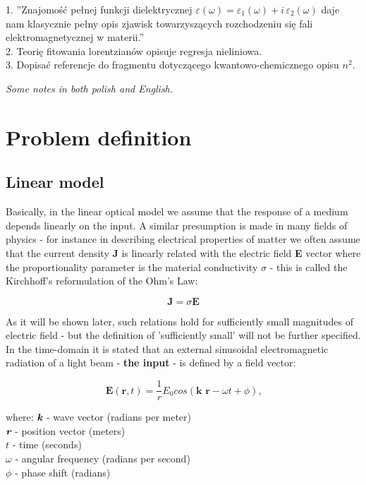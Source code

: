 \documentclass[12pt,twoside,a4paper]{article}
\numberwithin{equation}{subsection}
\numberwithin{figure}{subsection}
\begin{document}
1. ''Znajomość pełnej funkcji dielektrycznej $\varepsilon (\omega )={\varepsilon_{1}}(\omega ) + i\,{\varepsilon_{2}}(\omega )$
 daje nam klasycznie pełny opis zjawisk towarzyszących rozchodzeniu się fali elektromagnetycznej w materii.''\\
2. Teorię fitowania lorentzianów opisuje regresja nieliniowa.\\
3. Dopisać referencje do fragmentu dotyczącego kwantowo-chemicznego opisu $n^2$.

\textit{Some notes in both polish and English.}

\section{Problem definition} \label{chap:problem}

\subsection{Linear model} \label{chap:problem_lin}

Basically, in the linear optical model we assume that the response of a medium depends linearly on the input. A similar presumption
is made in many fields of physics - for instance in describing electrical properties of matter we often assume that the current density
\textbf{J} is linearly related with the electric field \textbf{E} vector where the proportionality parameter is the material
conductivity $\sigma $ - this is called the Kirchhoff's reformulation of the Ohm's Law:

\begin{equation} \label{eq:ohms_law}
  \textbf{J} = \sigma \textbf{E}
\end{equation}

As it will be shown later, such relations hold for sufficiently small magnitudes of electric field - but the definition of
'sufficiently small' will not be further specified. In the time-domain it is stated that an external sinusoidal electromagnetic 
radiation of a light beam - \textbf{the input} - is defined by a field vector:

\begin{equation} \label{eq:electromagnetic_radiation}
  \textbf{E} (\textbf{r}, t) =  \frac{1}{r} {E_{0}} cos(\textbf{k r} - \omega t + \phi) \mbox{,}
\end{equation}

where:
$\textit{\textbf{k}}$ - wave vector (radians per meter) \\
$\textit{\textbf{r}}$ - position vector (meters) \\
$t$ - time (seconds) \\
$\omega $ - angular frequency (radians per second) \\
$\phi $ - phase shift (radians)
\end{document}
